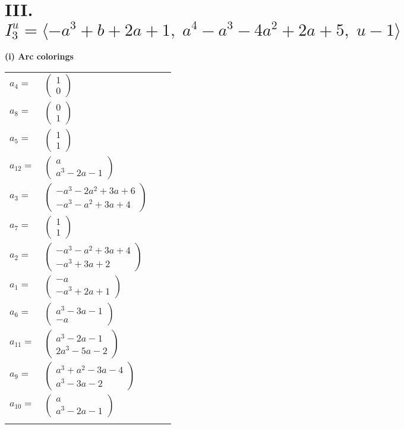 \documentclass[1p]{elsarticle_modified}
\theoremstyle{definition}
\begin{document}
\centering \section*{III. $I^u_{3}= \langle - a^3+b+2 a+1,\;a^4- a^3-4 a^2+2 a+5,\;u-1 \rangle$}
\flushleft \textbf{(i) Arc colorings}\\
\begin{tabular}{m{7pt} m{180pt} m{7pt} m{180pt} }
\flushright $a_{4}=$&$\begin{pmatrix}1\\0\end{pmatrix}$ \\
\flushright $a_{8}=$&$\begin{pmatrix}0\\1\end{pmatrix}$ \\
\flushright $a_{5}=$&$\begin{pmatrix}1\\1\end{pmatrix}$ \\
\flushright $a_{12}=$&$\begin{pmatrix}a\\a^3-2 a-1\end{pmatrix}$ \\
\flushright $a_{3}=$&$\begin{pmatrix}- a^3-2 a^2+3 a+6\\- a^3- a^2+3 a+4\end{pmatrix}$ \\
\flushright $a_{7}=$&$\begin{pmatrix}1\\1\end{pmatrix}$ \\
\flushright $a_{2}=$&$\begin{pmatrix}- a^3- a^2+3 a+4\\- a^3+3 a+2\end{pmatrix}$ \\
\flushright $a_{1}=$&$\begin{pmatrix}- a\\- a^3+2 a+1\end{pmatrix}$ \\
\flushright $a_{6}=$&$\begin{pmatrix}a^3-3 a-1\\- a\end{pmatrix}$ \\
\flushright $a_{11}=$&$\begin{pmatrix}a^3-2 a-1\\2 a^3-5 a-2\end{pmatrix}$ \\
\flushright $a_{9}=$&$\begin{pmatrix}a^3+a^2-3 a-4\\a^3-3 a-2\end{pmatrix}$ \\
\flushright $a_{10}=$&$\begin{pmatrix}a\\a^3-2 a-1\end{pmatrix}$\\&\end{tabular}
\end{document}
